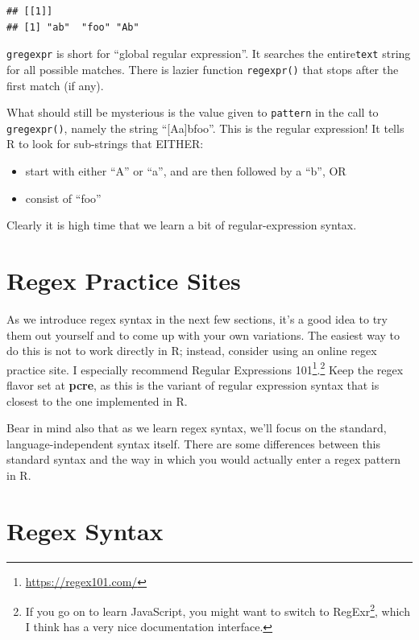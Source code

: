 \documentclass[]{book}
\providecommand{\tightlist}{%
  \setlength{\itemsep}{0pt}\setlength{\parskip}{0pt}}
\let\rmarkdownfootnote\footnote%
\def\footnote{\protect\rmarkdownfootnote}
\renewcommand{\href}[2]{#2\footnote{\url{#1}}}
\renewcommand{\href}[2]{#2\footnote{\url{#1}}}
\theoremstyle{definition}
\theoremstyle{definition}
\theoremstyle{definition}
\theoremstyle{remark}
\begin{document}
{\begin{verbatim}
## [[1]]
## [1] "ab"  "foo" "Ab"
\end{verbatim}

\texttt{gregexpr} is short for ``global regular expression''. It
searches the entire\texttt{text} string for all possible matches. There
is lazier function \texttt{regexpr()}
that stops after the
first match (if any).

What should still be mysterious is the value given to \texttt{pattern}
in the call to \texttt{gregexpr()}, namely the string
``{[}Aa{]}b\textbar{}foo''. This is the regular expression! It tells R
to look for sub-strings that EITHER:

\begin{itemize}
\tightlist
\item
  start with either ``A'' or ``a'', and are then followed by a ``b'', OR
\item
  consist of ``foo''
\end{itemize}

Clearly it is high time that we learn a bit of regular-expression
syntax.

\section{Regex Practice Sites}\label{regex-practice-sites}

As we introduce regex syntax in the next few sections, it's a good idea
to try them out yourself and to come up with your own variations. The
easiest way to do this is not to work directly in R; instead, consider
using an online regex practice site. I especially recommend
\href{https://regex101.com/}{Regular Expressions 101}.\footnote{If you
  go on to learn JavaScript, you might want to switch to
  \href{http://regexr.com/}{RegExr}, which I think has a very nice
  documentation interface.} Keep the regex flavor set at \textbf{pcre},
as this is the variant of regular expression syntax that is closest to
the one implemented in R.

Bear in mind also that as we learn regex syntax, we'll focus on the
standard, language-independent syntax itself. There are some differences
between this standard syntax and the way in which you would actually
enter a regex pattern in R.

\section{Regex Syntax}\label{regex-syntax}

}
\end{document}
